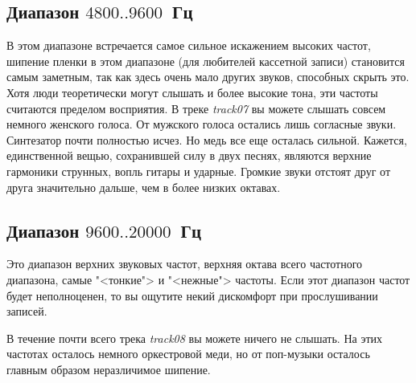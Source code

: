 \documentclass{beamer}
\begin{document}
\subsection{Диапазон $4800..9600$~Гц}
\begin{frame}
В этом диапазоне встречается самое сильное искажением высоких частот, шипение пленки в этом диапазоне (для любителей кассетной записи) становится самым заметным, так как здесь очень мало других звуков, способных скрыть это. Хотя люди теоретически могут слышать и более высокие тона, эти частоты считаются пределом восприятия. В треке \emph{track07} вы можете слышать совсем немного женского голоса. От мужского голоса остались лишь согласные звуки. Синтезатор почти полностью исчез. Но медь все еще осталась сильной. Кажется, единственной вещью, сохранившей силу в двух песнях, являются верхние гармоники струнных, вопль гитары и ударные. Громкие звуки отстоят друг от друга значительно дальше, чем в более низких октавах.

\end{frame}

\subsection{Диапазон $9600..20000$~Гц}
\begin{frame}
Это диапазон верхних звуковых частот, верхняя октава всего частотного диапазона, самые "<тонкие"> и "<нежные"> частоты. Если этот диапазон частот будет неполноценен, то вы ощутите некий дискомфорт при прослушивании записей.

В течение почти всего трека \emph{track08} вы можете ничего не слышать. На этих частотах осталось немного оркестровой меди, но от поп-музыки осталось главным образом неразличимое шипение.

\end{frame}
\end{document}
